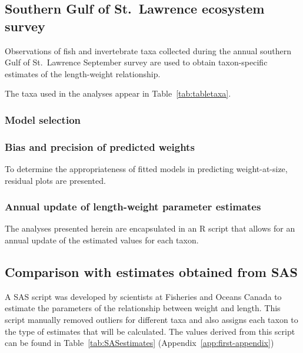 \documentclass[12pt]{article}\usepackage[]{graphicx}\usepackage[]{color}
\begin{document}
\subsection{Southern Gulf of St.~Lawrence ecosystem survey}\label{southern-gulf-of-st.-lawrence-ecosystem-survey}

Observations of fish and invertebrate taxa collected during the annual southern Gulf of St.~Lawrence September survey are used to obtain taxon-specific estimates of the length-weight relationship.

The taxa used in the analyses appear in Table~\ref{tab:tabletaxa}.

\subsubsection{Model selection}\label{model-selection}

\subsubsection{Bias and precision of predicted weights}\label{bias-and-precision-of-predicted-weights}

To determine the appropriateness of fitted models in predicting weight-at-size, residual plots are presented.

\subsubsection{Annual update of length-weight parameter estimates}\label{annual-update-of-length-weight-parameter-estimates}

The analyses presented herein are encapsulated in an R script that allows for an annual update of the estimated values for each taxon.

\subsection{Comparison with estimates obtained from SAS}\label{comparison-with-estimates-obtained-from-sas}

A SAS script was developed by scientists at Fisheries and Oceans Canada to estimate the parameters of the relationship between weight and length. This script manually removed outliers for different taxa and also assigns each taxon to the type of estimates that will be calculated. The values derived from this script can be found in Table~\ref{tab:SASestimates} (Appendix~\ref{app:first-appendix})
\end{document}
